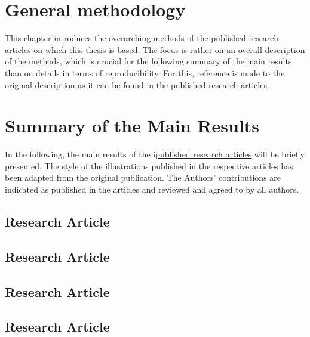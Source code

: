 \documentclass[oneside]{book}
\newcommand{\uproman}[1]{\uppercase\expandafter{\romannumeral#1}}
\begin{document}
    \label{chap:aims_scope}
    

\chapter{General methodology}
\label{chap:methods}
This chapter introduces the overarching methods of the \hyperref[pub:papers]{published research articles} on which this thesis is based. The focus is rather on an overall description of the methods, which is crucial for the following summary of the main results than on details in terms of reproducibility. For this, reference is made to the original description as it can be found in the \hyperref[pub:papers]{published research articles}.

    


\chapter{Summary of the Main Results}
In the following, the main results of the i\hyperref[pub:papers]{published research articles} will be briefly presented. The style of the illustrations published in the respective articles has been adapted from the original publication. The Authors' contributions are indicated as published in the articles and reviewed and agreed to by all authors.

\label{chap:results}
    \section{Research Article \uproman{1}}
    \label{results:paperI}
    
    
    \section{Research Article \uproman{2}}
    \label{results:paperII}
    

    \section{Research Article \uproman{3}}
    \label{results:paperIII}
    
    
    \section{Research Article \uproman{4}}
    \label{results:paperIV}
    
    
\end{document}
